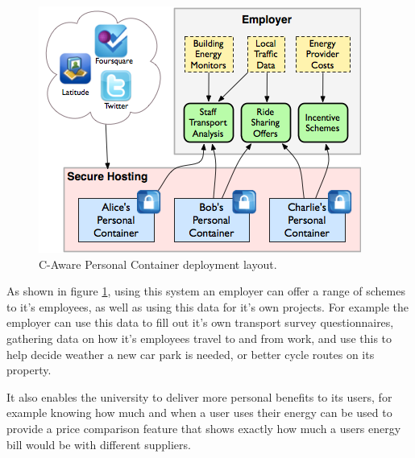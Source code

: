 \documentclass[11pt,a4paper,twoside]{article}
\begin{document}
\begin{figure}[h]
  \begin{center}
    \includegraphics[scale=0.7]{PersConDataflow.png}
  \end{center}
  \caption{C-Aware Personal Container deployment layout.}
  \label{img-persConDia}
\end{figure}

As shown in figure \ref{img-persConDia}, using this system an employer can offer a range of schemes to it's employees, as well as using this data for it's own projects. For example the employer can use this data to fill out it's own transport survey questionnaires, gathering data on how it's employees travel to and from work, and use this to help decide weather a new car park is needed, or better cycle routes on its property.

It also enables the university to deliver more personal benefits to its users, for example knowing how much and when a user uses their energy can be used to provide a price comparison feature that shows exactly how much a users energy bill would be with different suppliers.

\newpage

\renewcommand{\bibname}{References} %
\end{document}

